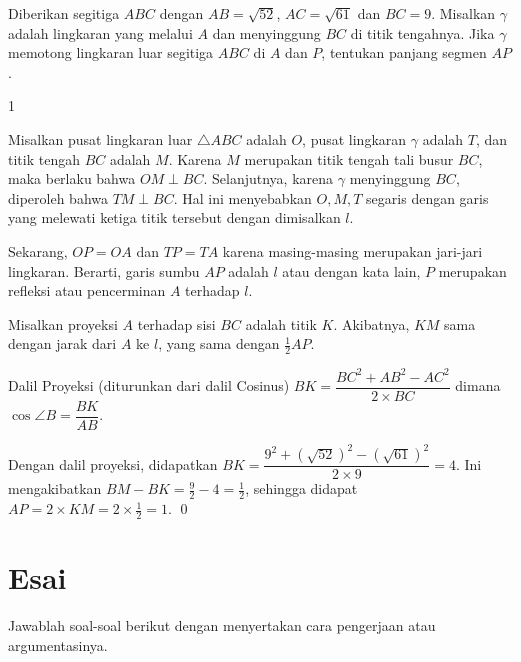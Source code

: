 \documentclass[11pt]{scrartcl}
\begin{document}
	\begin{soaljawab}
		Diberikan segitiga $ABC$ dengan $AB = \sqrt{52}$, $AC=\sqrt{61}$ dan $BC = 9$. Misalkan $\gamma$
		adalah lingkaran yang melalui $A$ dan menyinggung $BC$ di titik tengahnya. Jika $\gamma$
		memotong lingkaran luar segitiga $ABC$ di $A$ dan $P$, tentukan panjang segmen $AP$.
		
		\begin{jawaban}
		1
		\end{jawaban}
		\begin{solusi}
		Misalkan pusat lingkaran luar $\triangle ABC$ adalah $O$, pusat lingkaran $\gamma$ adalah $T$, dan titik tengah $BC$ adalah $M$. Karena $M$ merupakan titik tengah tali busur $BC$, maka berlaku bahwa $OM \perp BC$. Selanjutnya, karena $\gamma$ menyinggung $BC$, diperoleh bahwa $TM \perp BC$. Hal ini menyebabkan $O,M,T$ segaris dengan garis yang melewati ketiga titik tersebut dengan dimisalkan $l$. 
		
		Sekarang, $OP=OA$ dan $TP=TA$ karena masing-masing merupakan jari-jari lingkaran. Berarti, garis sumbu $AP$ adalah $l$ atau dengan kata lain, $P$ merupakan refleksi atau pencerminan $A$ terhadap $l$. 
		
		Misalkan proyeksi $A$ terhadap sisi $BC$ adalah titik $K$. Akibatnya, $KM$ sama dengan jarak dari $A$ ke $l$, yang sama dengan $\frac{1}{2}AP$. 
		
		\begin{lemmarev}
		Dalil Proyeksi (diturunkan dari dalil Cosinus) $BK = \dfrac{BC^2+AB^2-AC^2}{2\times BC}$
		dimana $\cos \angle B = \dfrac{BK}{AB}$.
		\end{lemmarev}
		
		Dengan dalil proyeksi, didapatkan $BK = \dfrac{9^2+(\sqrt{52})^2-(\sqrt{61})^2}{2\times 9}=4$. Ini mengakibatkan $BM-BK = \frac{9}{2}-4=\frac{1}{2}$, sehingga didapat $AP=2\times KM=2 \times \frac{1}{2}=1$. \qed
		

		\end{solusi}
	\end{soaljawab}
	\newpage
	\section{Esai}
	Jawablah soal-soal berikut dengan menyertakan cara pengerjaan atau argumentasinya.
	
\end{document}
